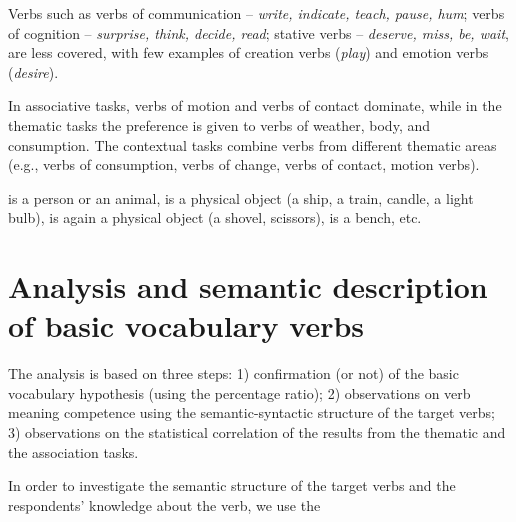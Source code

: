 \documentclass[output=paper,colorlinks,citecolor=brown]{langscibook}
\begin{document}
Verbs  such as verbs of communication -- \textit{write, indicate, teach, pause, hum}; verbs of cognition -- \textit{surprise, think, decide, read}; stative verbs -- \textit{deserve, miss, be, wait}, are less covered, with few examples of creation verbs (\textit{play}) and emotion verbs (\textit{desire}).

 In associative tasks, verbs of motion and verbs of contact dominate, while in the thematic tasks the preference is given to verbs of weather, body, and consumption. The contextual tasks combine verbs from different thematic areas (e.g., verbs of consumption, verbs of change, verbs of contact, motion verbs).

  is a person or an animal,  is a physical object (a ship, a train, candle, a light bulb),  is again a physical object (a shovel, scissors),  is a bench, etc. 



\section{Analysis and semantic description of basic vocabulary verbs}\label{sec:4}

The analysis is based on three steps: 1) confirmation (or not) of the basic vocabulary hypothesis (using the percentage ratio); 2) observations on verb meaning competence using the semantic-syntactic structure of the target verbs; 3) observations on the statistical correlation of the results from the thematic and the association tasks.

In order to investigate the semantic structure of the target verbs and the respondents' knowledge about the verb, we use the 
\end{document}
